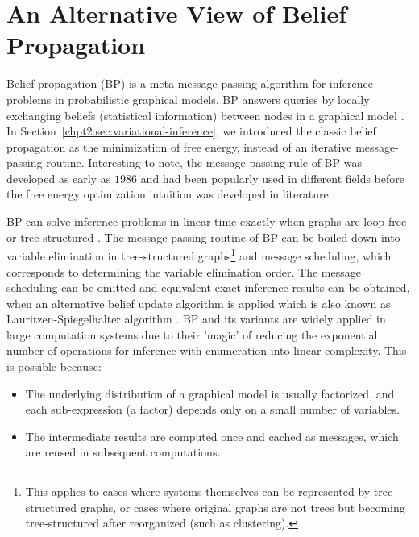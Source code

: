 \chapter{An Alternative View of Belief Propagation}
\label{chapter3}
\graphicspath{{source/chapter3/}}

Belief propagation (BP) is a meta message-passing algorithm for inference problems in probabilistic graphical models. BP answers queries by locally exchanging beliefs (statistical information) between nodes in a graphical model \cite{kschischang2001factor_graph, Bishop:2006:PRM:1162264}. In Section~\ref{chpt2:sec:variational-inference}, we introduced the classic belief propagation as the minimization of free energy, instead of an iterative message-passing routine. Interesting to note, the message-passing rule of BP was developed as early as $1986$ \cite{pearl1986b} and had been popularly used in different fields before the free energy optimization intuition was developed in literature \cite{yedidia2003understanding}.

BP can solve inference problems in linear-time exactly when graphs are loop-free or tree-structured \cite{kschischang2001factor_graph}. The message-passing routine of BP can be boiled down into variable elimination in tree-structured graphs\footnote{This applies to cases where systems themselves can be represented by tree-structured graphs, or cases where original graphs are not trees but becoming tree-structured after reorganized (such as clustering).} and message scheduling, which corresponds to determining the variable elimination order. The message scheduling can be omitted and equivalent exact inference results can be obtained, when an alternative belief update algorithm is applied which is also known as Lauritzen-Spiegelhalter algorithm \cite[Section~10.3]{koller2009pgm}. BP and its variants are widely applied in large computation systems due to their 'magic' of reducing the exponential number of operations for inference with enumeration into linear complexity. This is possible because: 
\begin{itemize}
\item The underlying distribution of a graphical model is usually factorized, and each sub-expression (a factor) depends only on a small number of variables.
\item The intermediate results are computed once and cached as messages, which are reused in subsequent computations. 
\end{itemize}

